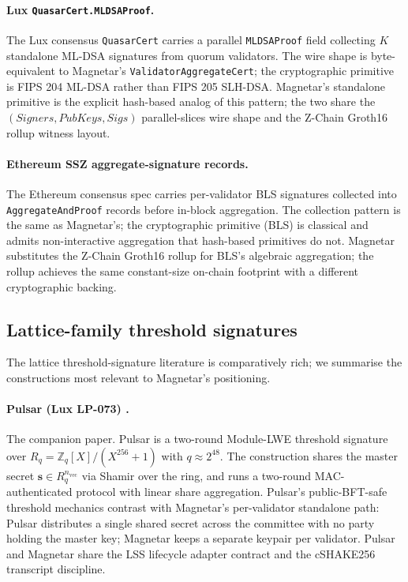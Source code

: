 \paragraph{Lux \texttt{QuasarCert.MLDSAProof}.} The Lux consensus
\texttt{QuasarCert} carries a parallel \texttt{MLDSAProof} field
collecting $K$ standalone ML-DSA signatures from quorum
validators. The wire shape is byte-equivalent to Magnetar's
\texttt{ValidatorAggregateCert}; the cryptographic primitive is
FIPS 204 ML-DSA \cite{fips204} rather than FIPS 205 SLH-DSA.
Magnetar's standalone primitive is the explicit hash-based
analog of this pattern; the two share the
$(\mathit{Signers}, \mathit{PubKeys}, \mathit{Sigs})$
parallel-slices wire shape and the Z-Chain Groth16 rollup
witness layout.

\paragraph{Ethereum SSZ aggregate-signature records.} The
Ethereum consensus spec carries per-validator BLS signatures
collected into \texttt{AggregateAndProof} records before
in-block aggregation. The collection pattern is the same as
Magnetar's; the cryptographic primitive (BLS) is classical and
admits non-interactive aggregation that hash-based primitives
do not. Magnetar substitutes the Z-Chain Groth16 rollup for
BLS's algebraic aggregation; the rollup achieves the same
constant-size on-chain footprint with a different cryptographic
backing.

\subsection{Lattice-family threshold signatures}
\label{sec:related:lattice}

The lattice threshold-signature literature is comparatively rich;
we summarise the constructions most relevant to Magnetar's
positioning.

\paragraph{Pulsar (Lux LP-073) \cite{lp073pulsarpaper}.}
The companion paper. Pulsar is a two-round Module-LWE threshold
signature over
$R_q = \mathbb{Z}_q[X]/(X^{256}+1)$ with $q \approx 2^{48}$. The
construction shares the master secret $\mathbf{s} \in
R_q^{n_{\mathrm{vec}}}$ via Shamir over the ring, and runs a
two-round MAC-authenticated protocol with linear share
aggregation. Pulsar's public-BFT-safe threshold mechanics
contrast with Magnetar's per-validator standalone path: Pulsar
distributes a single shared secret across the committee with
no party holding the master key; Magnetar keeps a separate
keypair per validator. Pulsar and Magnetar share the LSS
lifecycle adapter contract and the cSHAKE256 transcript
discipline.

